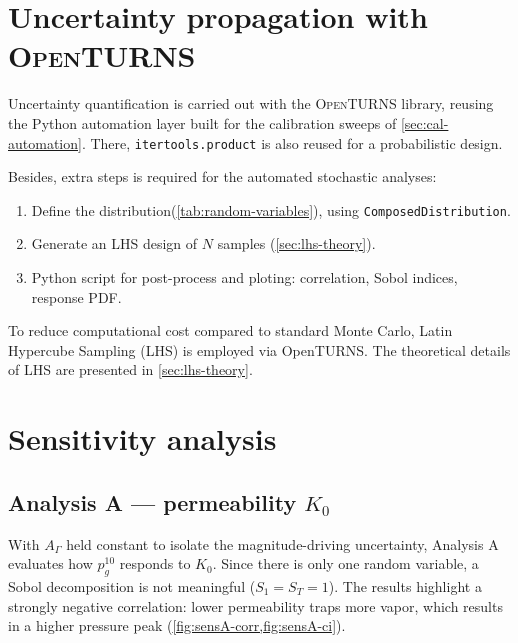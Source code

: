 \section{Uncertainty propagation with \texorpdfstring{\textsc{OpenTURNS}}{OpenTURNS}} \label{sec:propagation}
 
Uncertainty quantification is carried out with the \textsc{OpenTURNS} library, reusing the Python automation layer built for the calibration sweeps of \cref{sec:cal-automation}. There, \texttt{itertools.product} is also reused for a probabilistic design.

Besides, extra steps is required for the automated stochastic analyses:
\begin{enumerate}
  \item Define the distribution(\cref{tab:random-variables}), using \texttt{ComposedDistribution}.
  \item Generate an LHS design of $N$ samples (\cref{sec:lhs-theory}).
  \item Python script for post-process and ploting: correlation, Sobol indices, response PDF.
\end{enumerate}
 
 
To reduce computational cost compared to standard Monte Carlo, Latin Hypercube Sampling (LHS) is employed via OpenTURNS. The theoretical details of LHS are presented in \cref{sec:lhs-theory}.
 
\section{Sensitivity analysis} \label{sec:sensitivity}

\subsection{Analysis A --- permeability $K_0$} \label{sec:sens-K0}
With $A_\Gamma$ held constant to isolate the magnitude-driving uncertainty, Analysis A evaluates how $p_g^{10}$ responds to $K_0$. Since there is only one random variable, a Sobol decomposition is not meaningful ($S_1=S_{T}=1$). The results highlight a strongly negative correlation: lower permeability traps more vapor, which results in a higher pressure peak (\cref{fig:sensA-corr,fig:sensA-ci}). 


